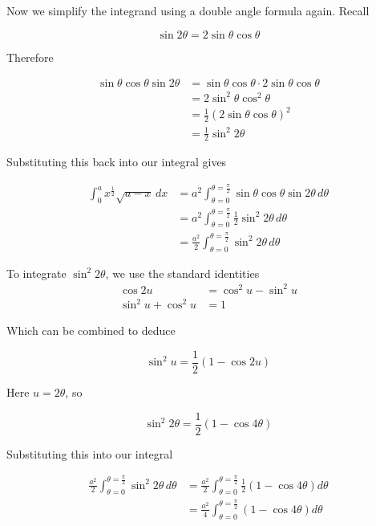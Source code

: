 \begin{solution}
    Now we simplify the integrand using a double angle formula again. Recall

    \[
        \sin 2\theta = 2\sin \theta \cos \theta
    \]

    Therefore

    \begin{align*}
        \sin \theta \cos \theta \sin 2\theta &= \sin \theta \cos \theta \cdot 2\sin \theta \cos \theta \\
        &= 2\sin^2 \theta \cos^2 \theta \\
        &= \frac{1}{2}\left(2\sin \theta \cos \theta\right)^2 \\
        &= \frac{1}{2} \sin^2 2\theta
    \end{align*}

    Substituting this back into our integral gives

    \begin{align*}
        \int_0^{a} x^{\frac{1}{2}} \sqrt{a - x} \, dx 
        &= a^2 \int_{\theta=0}^{\theta=\frac{\pi}{2}} \sin \theta \cos \theta \sin 2\theta \, d\theta \\
        &= a^2 \int_{\theta=0}^{\theta=\frac{\pi}{2}} \frac{1}{2} \sin^2 2\theta \, d\theta \\
        &= \frac{a^2}{2} \int_{\theta=0}^{\theta=\frac{\pi}{2}} \sin^2 2\theta \, d\theta
    \end{align*}

    To integrate $\sin^2 2\theta$, we use the standard identities
    \begin{align*}
        \cos 2u &= \cos^2 u - \sin^2 u    \\
        \sin^2 u + \cos^2 u &= 1
    \end{align*}

    Which can be combined to deduce 

    \[
        \sin^2 u = \frac{1}{2}(1 - \cos 2u)
    \]

    Here $u = 2\theta$, so

    \[
        \sin^2 2\theta = \frac{1}{2}\left(1 - \cos 4\theta\right)
    \]

    Substituting this into our integral

    \begin{align*}
        \frac{a^2}{2} \int_{\theta=0}^{\theta=\frac{\pi}{2}} \sin^2 2\theta \, d\theta
        &= \frac{a^2}{2} \int_{\theta=0}^{\theta=\frac{\pi}{2}} \frac{1}{2}\left(1 - \cos 4\theta\right) d\theta \\
        &= \frac{a^2}{4} \int_{\theta=0}^{\theta=\frac{\pi}{2}} \left(1 - \cos 4\theta\right) d\theta
    \end{align*}


\end{solution}
